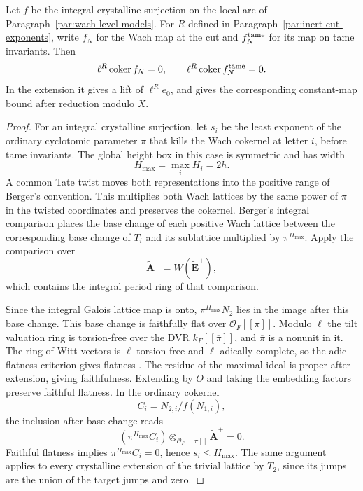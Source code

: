 \begin{lemma}\label{lem:wach-cut-annihilator}
Let \(f\) be the integral crystalline surjection on the local
arc of Paragraph~\ref{par:wach-level-models}. For \(R\) defined
in Paragraph~\ref{par:inert-cut-exponents}, write \(f_N\) for the Wach map at the cut and \(f_N^{\rm tame}\) for its map on tame invariants. Then
\[
 \ell^R\operatorname{coker} f_N=0,\qquad \ell^R\operatorname{coker} f_N^{\rm tame}=0.
\]
In the extension it gives a lift of \(\ell^R e_0\), and gives
the corresponding constant-map bound after reduction modulo \(X\).
\end{lemma}

\begin{proof}
For an integral crystalline surjection, let \(s_i\) be the
least exponent of the ordinary cyclotomic parameter \(\pi\)
that kills the Wach cokernel at letter \(i\), before tame
invariants. The global height box in this case is symmetric
and has width
\[
 H_{\max}=\max_i H_i=2h.
\]
A common Tate
twist moves both representations into the positive range
of Berger's convention. This multiplies both Wach lattices
by the same power of \(\pi\) in the twisted coordinates and
preserves the cokernel. Berger's integral comparison
\cite[Theorem III.3.1]{berger-wach} places the base change of
each positive Wach lattice between the corresponding base
change of \(T_i\) and its sublattice multiplied by
\(\pi^{H_{\max}}\). Apply the comparison over
\[
 \widetilde{\mathbf A}^{+}=W(\widetilde{\mathbf E}^{+}),
\]
which contains the integral period ring of that comparison.

Since the integral Galois lattice map is onto,
\(\pi^{H_{\max}}N_2\) lies in the image after this base change.
This base change is faithfully flat over
\(\mathcal O_F[[\pi]]\). Modulo \(\ell\) the tilt valuation
ring is torsion-free over the DVR \(k_F[[\overline\pi]]\),
and \(\overline\pi\) is a nonunit in it. The ring of Witt
vectors is \(\ell\)-torsion-free and \(\ell\)-adically complete,
so the adic flatness criterion gives flatness
\cite[Lemma 15.28.5]{stacks-flat}. The residue of the maximal
ideal is proper after extension, giving faithfulness.
Extending by \(O\) and taking the embedding factors preserve
faithful flatness. In the ordinary cokernel
\[
 C_i=N_{2,i}/f(N_{1,i}),
\]
the inclusion
after base change reads
\[
 (\pi^{H_{\max}}C_i)\otimes_{\mathcal O_F[[\pi]]}
      \widetilde{\mathbf A}^+=0.
\]
Faithful flatness implies \(\pi^{H_{\max}}C_i=0\), hence \(s_i\le H_{\max}\). The same argument applies to every crystalline
extension of the trivial lattice by \(T_2\), since its
jumps are the union of the target jumps and zero.


\end{proof}
